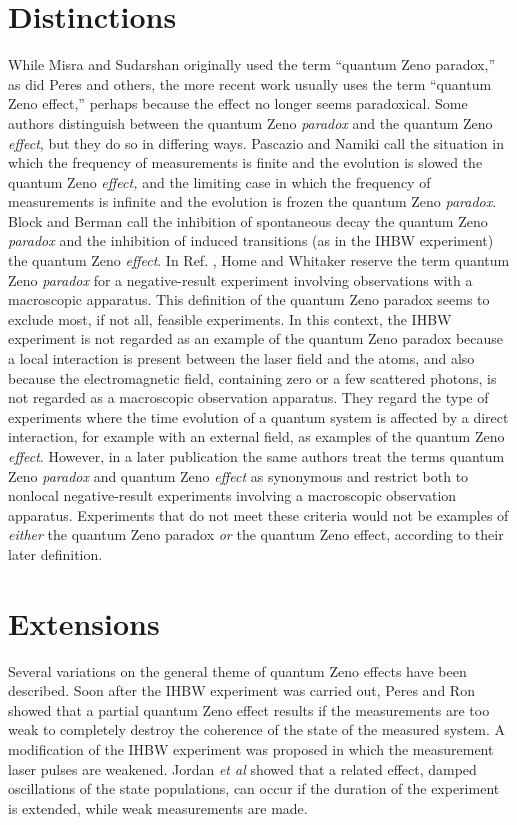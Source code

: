 \documentclass[letterpaper]{jpconf}
\begin{document}
\section{Distinctions}

While Misra and Sudarshan originally used the term ``quantum Zeno
paradox,'' as did Peres \cite{peres80} and others, the more recent
work usually uses the term ``quantum Zeno effect,'' perhaps because
the effect no longer seems paradoxical.  Some authors distinguish
between the quantum Zeno {\em paradox} and the quantum Zeno {\em
effect}, but they do so in differing ways. Pascazio and Namiki
\cite{pascazio94} call the situation in which the frequency of
measurements is finite and the evolution is slowed the quantum Zeno
{\em effect,} and the limiting case in which the frequency of
measurements is infinite and the evolution is frozen the quantum
Zeno {\em paradox}.   Block and Berman \cite{block91} call the
inhibition of spontaneous decay the quantum Zeno {\em paradox} and
the inhibition of induced transitions (as in the IHBW experiment)
the quantum Zeno {\em effect}. In Ref. \cite{home92}, Home and
Whitaker reserve the term quantum Zeno {\em paradox} for a
negative-result experiment involving observations with a macroscopic
apparatus.  This definition of the quantum Zeno paradox seems to
exclude most, if not all, feasible experiments.  In this context,
the IHBW experiment is not regarded as an example of the quantum
Zeno paradox because a local interaction is present between the
laser field and the atoms, and also because the electromagnetic
field, containing zero or a few scattered photons, is not regarded
as a macroscopic observation apparatus.  They regard the type of
experiments where the time evolution of a quantum system is affected
by a direct interaction, for example with an external field, as
examples of the quantum Zeno {\em effect}.  However, in a later
publication \cite{home97} the same authors treat the terms quantum
Zeno {\em paradox} and quantum Zeno {\em effect} as synonymous and
restrict both to nonlocal negative-result experiments involving a
macroscopic observation apparatus.  Experiments that do not meet
these criteria would not be examples of {\em either} the quantum
Zeno paradox {\em or} the quantum Zeno effect, according to their
later definition.

\section{Extensions}


Several variations on the general theme of quantum Zeno effects have
been described.   Soon after the IHBW experiment was carried out,
Peres and Ron \cite{peres90} showed that a partial quantum Zeno
effect results if the measurements are too weak to completely
destroy the coherence of the state of the measured system.  A
modification of the IHBW experiment was proposed in which the
measurement laser pulses are weakened.  Jordan {\em et al}
\cite{jordan91} showed that a related effect, damped oscillations of
the state populations, can occur if the duration of the experiment
is extended, while weak measurements are made.
\end{document}
